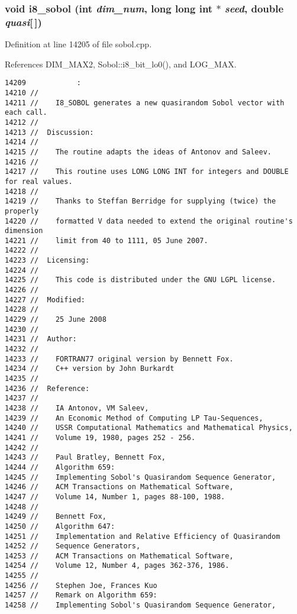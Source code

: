\subsubsection{\setlength{\rightskip}{0pt plus 5cm}void i8\_\-sobol (int {\em dim\_\-num}, long long int $\ast$ {\em seed}, double {\em quasi}[$\,$])}\label{test_2sobol_8H_687d6bd2ce71be51a560e949d4ec371a}




Definition at line 14205 of file sobol.cpp.

References DIM\_\-MAX2, Sobol::i8\_\-bit\_\-lo0(), and LOG\_\-MAX.

\begin{Code}\begin{verbatim}14209            :
14210 //
14211 //    I8_SOBOL generates a new quasirandom Sobol vector with each call.
14212 //
14213 //  Discussion:
14214 //
14215 //    The routine adapts the ideas of Antonov and Saleev.
14216 //
14217 //    This routine uses LONG LONG INT for integers and DOUBLE for real values.
14218 //
14219 //    Thanks to Steffan Berridge for supplying (twice) the properly
14220 //    formatted V data needed to extend the original routine's dimension
14221 //    limit from 40 to 1111, 05 June 2007.
14222 //
14223 //  Licensing:
14224 //
14225 //    This code is distributed under the GNU LGPL license. 
14226 //
14227 //  Modified:
14228 //
14229 //    25 June 2008
14230 //
14231 //  Author:
14232 //
14233 //    FORTRAN77 original version by Bennett Fox.
14234 //    C++ version by John Burkardt
14235 //
14236 //  Reference:
14237 //
14238 //    IA Antonov, VM Saleev,
14239 //    An Economic Method of Computing LP Tau-Sequences,
14240 //    USSR Computational Mathematics and Mathematical Physics,
14241 //    Volume 19, 1980, pages 252 - 256.
14242 //
14243 //    Paul Bratley, Bennett Fox,
14244 //    Algorithm 659:
14245 //    Implementing Sobol's Quasirandom Sequence Generator,
14246 //    ACM Transactions on Mathematical Software,
14247 //    Volume 14, Number 1, pages 88-100, 1988.
14248 //
14249 //    Bennett Fox,
14250 //    Algorithm 647:
14251 //    Implementation and Relative Efficiency of Quasirandom 
14252 //    Sequence Generators,
14253 //    ACM Transactions on Mathematical Software,
14254 //    Volume 12, Number 4, pages 362-376, 1986.
14255 //
14256 //    Stephen Joe, Frances Kuo
14257 //    Remark on Algorithm 659:
14258 //    Implementing Sobol's Quasirandom Sequence Generator,

\end{verbatim}
\end{Code}
